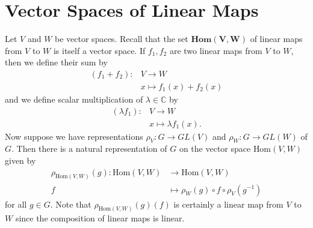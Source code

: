 \section{Vector Spaces of Linear Maps}
\begin{defn}
Let $V$ and $W$ be vector spaces.  Recall that the set $\textbf{Hom}\mathbf{(V,W)}$ of linear maps from $V$ to $W$ is itself a vector space.  If $f_1, f_2$ are two linear maps from $V$ to $W$, then we define their sum by
\begin{align*}		
(f_1 + f_2) \colon &V \to W \\		
&x \mapsto f_1(x) + f_2(x)		
\end{align*}		
and we define scalar multiplication of $\lambda \in \mathbb{C}$ by		
\begin{align*}		
(\lambda f_1) \colon &V \to W \\		
&x \mapsto \lambda f_1(x).		
\end{align*}		
Now suppose we have representations $\rho_V \colon G \to GL(V)$ and $\rho_W \colon G \to GL(W)$ of $G$. Then there is a natural representation of $G$ on the vector space $\text{Hom}(V,W)$ given by
\begin{align*}		
 \rho_{\text{Hom}(V,W)}(g)  \colon \text{Hom}(V,W) &\to \text{Hom}(V,W) \\		
 f &\mapsto \rho_{W}(g) \circ f \circ \rho_{V}(g^{-1})
 \end{align*}		
for all $g \in G$. Note that $\rho_{\text{Hom}(V,W)}(g)(f)$ is certainly a linear map from $V$ to $W$ since the composition of linear maps is linear.
\end{defn}

